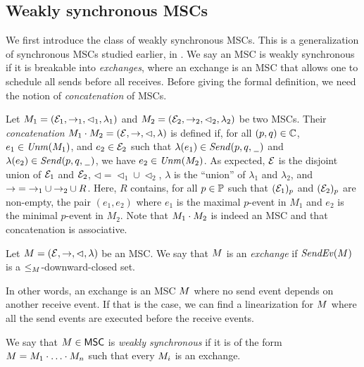 \subsection{Weakly synchronous MSCs}

We first introduce the class of weakly synchronous MSCs. This is a generalization of synchronous MSCs studied earlier, in \cite{DBLP:conf/cav/BouajjaniEJQ18, DBLP:conf/fossacs/GiustoLL20}. We say an MSC is weakly synchronous if it is breakable into \emph{exchanges}, where an exchange is an MSC that allows one to schedule all sends before all receives. Before giving the formal definition, we need the notion of \emph{concatenation} of MSCs.


Let $M_1 = (\mathcal{E}_1,\to_1,\lhd_1,\lambda_1)$ and
$M_2 = (\mathcal{E}_2,\to_2,\lhd_2,\lambda_2)$ be two MSCs.
Their \emph{concatenation} $M_1 \cdot M_2 = (\mathcal{E},\to,\lhd,\lambda)$ is defined if, for all $(p,q) \in \mathbb{C}$,
$e_1 \in \mathit{Unm}(M_1)$, and
$e_2 \in \mathcal{E}_2$ such that $\lambda(e_1) \in {\mathit{Send}(p,q,\hspace{0.1em}\underline{\hspace{0.5em}}\hspace{0.1em})}$
and $\lambda(e_2) \in {\mathit{Send}(p,q,\hspace{0.1em}\underline{\hspace{0.5em}}\hspace{0.1em})}$,
we have $e_2 \in \mathit{Unm}(M_2)$.
As expected, $\mathcal{E}$ is the disjoint union of $\mathcal{E}_1$ and $\mathcal{E}_2$,
${\lhd}  = {\lhd_1} \cup {\lhd_2}$, $\lambda$ is the ``union'' of $\lambda_1$
and $\lambda_2$, and ${\to} = {\to_1} \cup {\to_2} \cup R$.
Here, $R$ contains, for all $p \in \mathbb{P}$ such that $(\mathcal{E}_1)_p$ and
$(\mathcal{E}_2)_p$ are non-empty, the pair $(e_1,e_2)$ where $e_1$ is the
maximal $p$-event in $M_1$ and $e_2$ is the minimal $p$-event in $M_2$.
Note that $M_1 \cdot M_2$ is indeed an MSC and that
concatenation is associative.

\begin{definition}[exchange]\label{def:weak-synchr}
Let $M = (\mathcal{E},\to,\lhd,\lambda)$ be an MSC.
We say that $M$ is an \emph{exchange} if
$\mathit{SendEv}(M)$ is
a ${\le_M}$-downward-closed set.
\end{definition}

In other words, an exchange is an MSC $M$ where no send event depends on another receive event. If that is the case, we can find a linearization for $M$ where all the send events are executed before the receive events. 

\begin{definition}\label{def:weaksync-new}
	We say that $M \in \mathsf{MSC}$ is
	\emph{weakly synchronous} if it is of the form
	$M = M_1 \cdot \ldots \cdot M_n$
	such that every $M_i$ is an exchange.
\end{definition}

